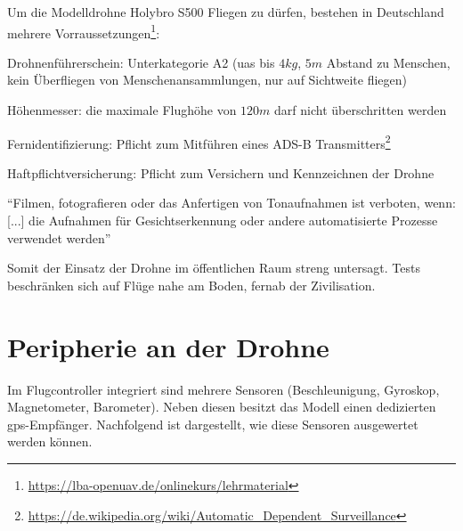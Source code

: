 Um die Modelldrohne Holybro S500 Fliegen zu dürfen, bestehen in Deutschland mehrere Vorraussetzungen\footnote{\url{https://lba-openuav.de/onlinekurs/lehrmaterial}}:
\begin{compactitem}
	\item Drohnenführerschein: Unterkategorie A2 (\gls{uas} bis $4kg$, $5m$ Abstand zu Menschen, kein Überfliegen von Menschenansammlungen, nur auf Sichtweite fliegen)
	\item Höhenmesser: die maximale Flughöhe von $120m$ darf nicht überschritten werden
	\item Fernidentifizierung: Pflicht zum Mitführen eines ADS-B Transmitters\footnote{\url{https://de.wikipedia.org/wiki/Automatic_Dependent_Surveillance}} 
	\item Haftpflichtversicherung: Pflicht zum Versichern und Kennzeichnen der Drohne
	\item \enquote{Filmen, fotografieren oder das Anfertigen von Tonaufnahmen ist verboten, wenn: [...] die Aufnahmen für Gesichtserkennung oder andere automatisierte Prozesse verwendet werden}
\end{compactitem}

Somit der Einsatz der Drohne im öffentlichen Raum streng untersagt. Tests beschränken sich auf Flüge nahe am Boden, fernab der Zivilisation.

\section{Peripherie an der Drohne}
Im Flugcontroller integriert sind mehrere Sensoren (Beschleunigung, Gyroskop, Magnetometer, Barometer). Neben diesen besitzt das Modell einen dedizierten \gls{gps}-Empfänger. Nachfolgend ist dargestellt, wie diese Sensoren ausgewertet werden können.

